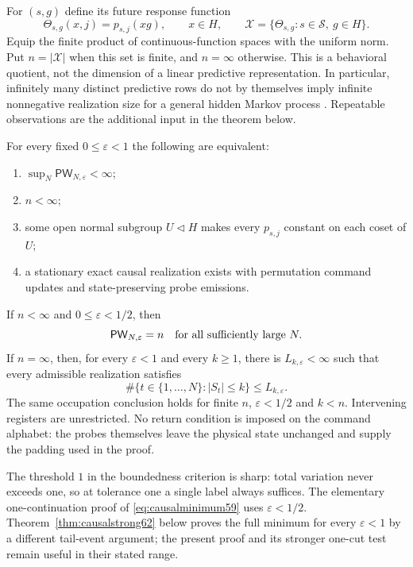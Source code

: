 For $(s,g)$ define its future response function
\begin{equation}\label{eq:futuretype59}
 \Theta_{s,g}(x,j)=p_{s,j}(xg),\qquad x\in H,
 \qquad \mathcal X=\{\Theta_{s,g}:s\in\mathcal S,\ g\in H\}.
\end{equation}
Equip the finite product of continuous-function spaces with the uniform
norm. Put $n=|\mathcal X|$ when this set is finite, and $n=\infty$
otherwise. This is a behavioral quotient, not the dimension of a linear
predictive representation. In particular, infinitely many distinct
predictive rows do not by themselves imply infinite nonnegative
realization size for a general hidden Markov process
\cite[Theorem~2 and Section~4]{SJR2004}. Repeatable observations are the
additional input in the theorem below.

\begin{theorem}
\label{thm:causalclassification59}
For every fixed $0\le\varepsilon<1$ the following are equivalent:
\begin{enumerate}
\item $\sup_N\mathsf{PW}_{N,\varepsilon}<\infty$;
\item $n<\infty$;
\item some open normal subgroup $U\lhd H$ makes every $p_{s,j}$ constant
      on each coset of $U$;
\item a stationary exact causal realization exists with permutation
      command updates and state-preserving probe emissions.
\end{enumerate}
If $n<\infty$ and $0\le\varepsilon<1/2$, then
\begin{equation}\label{eq:causalminimum59}
                   \mathsf{PW}_{N,\varepsilon}=n
                   \quad\hbox{for all sufficiently large }N.
\end{equation}
If $n=\infty$, then, for every $\varepsilon<1$ and every $k\ge1$,
there is $L_{k,\varepsilon}<\infty$ such that every admissible realization
satisfies
\begin{equation}\label{eq:causaloccupation59}
 \#\{t\in\{1,\ldots,N\}:|S_t|\le k\}\le L_{k,\varepsilon}.
\end{equation}
The same occupation conclusion holds for finite $n$, $\varepsilon<1/2$
and $k<n$. Intervening registers are unrestricted. No return condition
is imposed on the command alphabet: the probes themselves leave the
physical state unchanged and supply the padding used in the proof.
\end{theorem}
The threshold $1$ in the boundedness criterion is sharp: total variation
never exceeds one, so at tolerance one a single label always suffices.
The elementary one-continuation proof of \eqref{eq:causalminimum59}
uses $\varepsilon<1/2$. Theorem~\ref{thm:causalstrong62} below
proves the full minimum for every $\varepsilon<1$ by a different
tail-event argument; the present proof and its stronger one-cut test
remain useful in their stated range.

